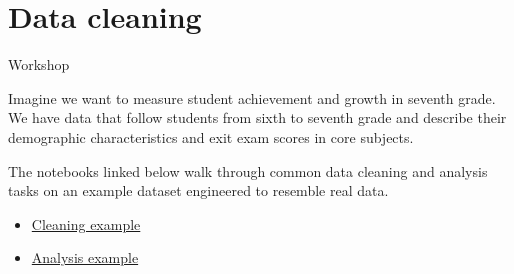 \documentclass{beamer}
\begin{document}
\section{Data cleaning}

\begin{frame}{Workshop}

  Imagine we want to measure student achievement and growth in seventh grade. We have data that follow students from sixth to seventh grade and describe their demographic characteristics and exit exam scores in core subjects.

  The notebooks linked below walk through common data cleaning and analysis tasks on an example dataset engineered to resemble real data.

  \begin{itemize}
    \item \href{https://github.com/lavalleedelgado/penn-gse-data-workshop/blob/main/src/01-clean-data.qmd}{Cleaning example}
    \item \href{https://github.com/lavalleedelgado/penn-gse-data-workshop/blob/main/src/02-run-analysis.qmd}{Analysis example}
  \end{itemize}

\end{frame}
\end{document}
